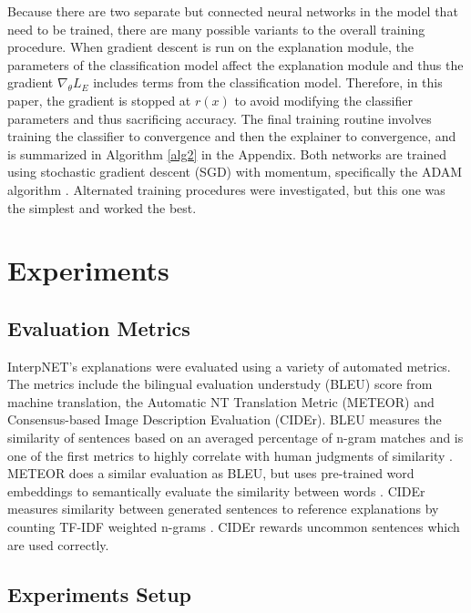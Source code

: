 \documentclass{article}
\begin{document}
Because there are two separate but connected neural networks in the model that need to be trained, there are many possible variants to the overall training procedure. When gradient descent is run on the explanation module, the parameters of the classification model affect the explanation module and thus the gradient $\nabla_{\theta} L_E$ includes terms from the classification model. Therefore, in this paper, the gradient is stopped at $r(x)$ to avoid modifying the classifier parameters and thus sacrificing accuracy. The final training routine involves training the classifier to convergence and then the explainer to convergence, and is summarized in Algorithm \ref{alg2} in the Appendix. Both networks are trained using stochastic gradient descent (SGD) with momentum, specifically the ADAM algorithm \cite{kingma2014adam}. Alternated training procedures were investigated, but this one was the simplest and worked the best.

\section{Experiments}
\subsection{Evaluation Metrics}

InterpNET's explanations were evaluated using a variety of automated metrics. The metrics include the bilingual evaluation understudy (BLEU) score from machine translation, the Automatic NT Translation Metric (METEOR) and Consensus-based Image Description Evaluation (CIDEr). BLEU measures the similarity of sentences based on an averaged percentage of n-gram matches \cite{bleu} and is one of the first metrics to highly correlate with human judgments of similarity \cite{evaluating_bleu}. METEOR does a similar evaluation as BLEU, but uses pre-trained word embeddings to semantically evaluate the similarity between words \cite{denkowski:lavie:meteor-wmt:2014}. CIDEr measures similarity between generated sentences to reference explanations by counting TF-IDF weighted n-grams \cite{vedantam2015cider}. CIDEr rewards uncommon sentences which are used correctly.

\subsection{Experiments Setup}
\end{document}
